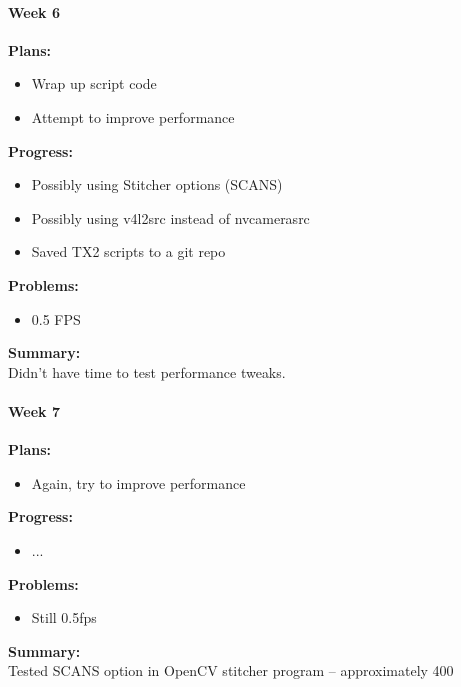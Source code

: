 \paragraph{Week 6}
\begin{adjustwidth}{2.5em}{0pt}
    \vspace{-0.5cm}\textbf{Plans:}
    \vspace{-0.5cm}
    \begin{itemize}
        \item Wrap up script code
        \item Attempt to improve performance
    \end{itemize} 
    \vspace{-0.3cm}\textbf{Progress:}
    \vspace{-0.5cm}
    \begin{itemize}
        \item Possibly using Stitcher options (SCANS)
        \item Possibly using v4l2src instead of nvcamerasrc
        \item Saved TX2 scripts to a git repo
    \end{itemize} 
    \vspace{-0.3cm}\textbf{Problems:}
    \vspace{-0.5cm}
    \begin{itemize}
        \item 0.5 FPS
    \end{itemize}  
    \vspace{-0.3cm}\noindent\textbf{Summary:}\\
    \noindent 
    Didn't have time to test performance tweaks.
\end{adjustwidth} 

\paragraph{Week 7}
\begin{adjustwidth}{2.5em}{0pt}
    \vspace{-0.5cm}\textbf{Plans:}
    \vspace{-0.5cm}
    \begin{itemize}
        \item Again, try to improve performance
    \end{itemize} 
    \vspace{-0.3cm}\textbf{Progress:}
    \vspace{-0.5cm}
    \begin{itemize}
        \item ...
    \end{itemize} 
    \vspace{-0.3cm}\textbf{Problems:}
    \vspace{-0.5cm}
    \begin{itemize}
        \item Still 0.5fps 
    \end{itemize}  
    \vspace{-0.3cm}\noindent\textbf{Summary:}\\
    \noindent 
    Tested SCANS option in OpenCV stitcher program -- approximately 400%
\end{adjustwidth} 